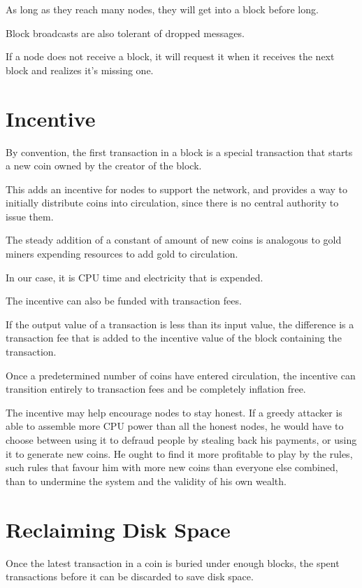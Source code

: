 \documentclass{article}
\begin{document}
As long as they reach many nodes, they will get into a block before long.

Block broadcasts are also tolerant of dropped messages.

If a node does not receive a block, it will request it when it receives the next block and realizes it's missing one.

\section{Incentive}
By convention, the first transaction in a block is a special transaction that starts a new coin owned by the creator of the block.

This adds an incentive for nodes to support the network, and provides a way to initially distribute coins into circulation, since there is no central authority to issue them.

The steady addition of a constant of amount of new coins is analogous to gold miners expending resources to add gold to circulation.

In our case, it is CPU time and electricity that is expended.

The incentive can also be funded with transaction fees.

If the output value of a transaction is less than its input value, the difference is a transaction fee that is added to the incentive value of the block containing the transaction.

Once a predetermined number of coins have entered circulation, the incentive can transition entirely to transaction fees and be completely inflation free.

The incentive may help encourage nodes to stay honest. If a greedy attacker is able to assemble more CPU power than all the honest nodes, he would have to choose between using it to defraud people by stealing back his payments, or using it to generate new coins. He ought to find it more profitable to play by the rules, such rules that favour him with more new coins than everyone else combined, than to undermine the system and the validity of his own wealth.

\section{Reclaiming Disk Space}
Once the latest transaction in a coin is buried under enough blocks, the spent transactions before it can be discarded to save disk space.
\end{document}
